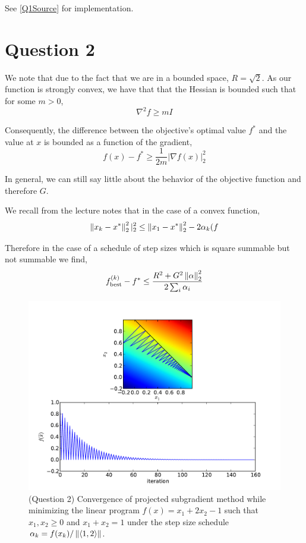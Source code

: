 \documentclass{article}
\begin{document}
See \ref{Q1Source} for implementation.

\section{Question 2}

We note that due to the fact that we are in a bounded space, $R =
\sqrt{2}$. As our function is strongly convex, we have that that the
Hessian is bounded such that for some $m > 0$,
\[ \nabla^2 f \ge m I \]

Consequently, the difference between the objective's optimal value
$f^*$ and the value at $x$ is bounded as a function of the gradient,
\[ f(x) - f^* \ge \frac{1}{2m} \vert \nabla f(x) \vert^2_2 \]

In general, we can still say little about the behavior of
the objective function and therefore $G$.

We recall from the lecture notes that in the case of a convex function,
\[ \left\lVert x_k - x^* \right\rVert_2^2 \vert_2^2 \le \left\lVert x_1 - x^* \right\rVert_2^2
   - 2\alpha_k (f \]

Therefore in the case of a schedule of step sizes which is square
summable but not summable we find,
\[ f_\mathrm{best}^{(k)} - f^* \le \frac{R^2 + G^2 \left\lVert \alpha \right\rVert_2^2}{2 \sum_i \alpha_i} \]

\begin{figure}
  \center
  \includegraphics[scale=0.5]{q2-convergence.pdf}
  \caption{(Question 2) Convergence of projected subgradient method
while minimizing the linear program $f(x) = x_1 + 2x_2 - 1$ such that
$x_1, x_2 \ge 0$ and $x_1 + x_2 = 1$ under the step size schedule
$\alpha_k = f(x_k) / \left\lVert \langle 1,2\rangle \right\rVert$.}
  \label{Fig:Q2Convergence}
\end{figure}
\end{document}
